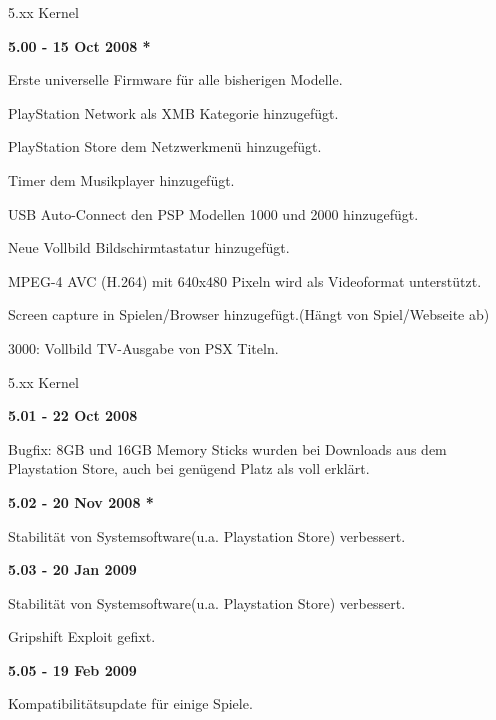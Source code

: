 \documentclass[mode=print,paper=screen,size=10pt,style=paintings]{powerdot}
\begin{document}
\begin{slide}{5.xx Kernel}
	\begin{large}\textbf{5.00 - 15 Oct 2008 *}\end{large}
	\begin{list}{-}{}
		\item{Erste universelle Firmware für alle bisherigen Modelle.}
		\item{PlayStation Network als XMB Kategorie hinzugefügt.}
		\item{PlayStation Store dem Netzwerkmenü hinzugefügt.}
		\item{Timer dem Musikplayer hinzugefügt.}
		\item{USB Auto-Connect den PSP Modellen 1000 und 2000 hinzugefügt.}
		\item{Neue Vollbild Bildschirmtastatur hinzugefügt.}
		\item{MPEG-4 AVC (H.264) mit 640x480 Pixeln wird als Videoformat unterstützt.}
		\item{Screen capture in Spielen/Browser hinzugefügt.(Hängt von Spiel/Webseite ab)} 
		\item{3000: Vollbild TV-Ausgabe von PSX Titeln.}
	\end{list}
\end{slide}

\begin{slide}{5.xx Kernel}
	\begin{large}\textbf{5.01 - 22 Oct 2008}\end{large}
	\begin{list}{-}{}
		\item{Bugfix: 8GB und 16GB Memory Sticks wurden bei Downloads aus dem Playstation Store, auch bei genügend Platz als voll erklärt.}
	\end{list}
	\begin{large}\textbf{5.02 - 20 Nov 2008 *}\end{large}
	\begin{list}{-}{}
		\item{Stabilität von Systemsoftware(u.a. Playstation Store) verbessert.}
	\end{list}
	\begin{large}\textbf{5.03 - 20 Jan 2009}\end{large}
	\begin{list}{-}{}
		\item{Stabilität von Systemsoftware(u.a. Playstation Store) verbessert.}
		\item{Gripshift Exploit gefixt.}
	\end{list}
	\begin{large}\textbf{5.05 - 19 Feb 2009}\end{large}
	\begin{list}{-}{}
		\item{Kompatibilitätsupdate für einige Spiele.}
	\end{list}
\end{slide}
\end{document}
